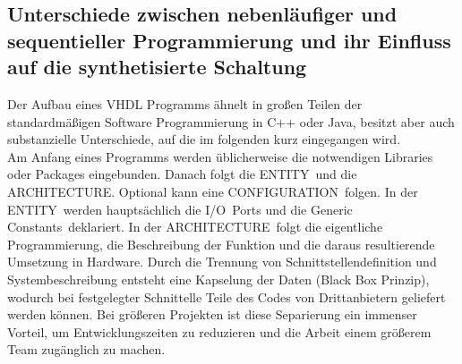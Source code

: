 \documentclass[12pt,a4paper]{scrartcl}	%
\begin{document}
\subsection{Unterschiede zwischen nebenläufiger und sequentieller Programmierung und ihr Einfluss auf die synthetisierte Schaltung}
Der Aufbau eines VHDL Programms ähnelt in großen Teilen der standardmäßigen Software Programmierung in C++ oder Java, besitzt aber auch substanzielle Unterschiede, auf die im folgenden kurz eingegangen wird.\\
Am Anfang eines Programms werden üblicherweise die notwendigen Libraries oder Packages eingebunden. 
Danach folgt die \glqq ENTITY\grqq~und die \glqq ARCHITECTURE\grqq. Optional kann eine \glqq CONFIGURATION\grqq~folgen.
In der \glqq ENTITY\grqq~werden hauptsächlich die \glqq I/O\grqq~Ports und die \glqq Generic Constants\grqq~deklariert.
In der \glqq ARCHITECTURE\grqq~folgt die eigentliche Programmierung, die Beschreibung der Funktion und die daraus resultierende Umsetzung in Hardware. Durch die Trennung von Schnittstellendefinition und Systembeschreibung entsteht eine Kapselung der Daten (Black Box Prinzip), wodurch bei festgelegter Schnittelle Teile des Codes von Drittanbietern geliefert werden können. Bei größeren Projekten ist diese Separierung ein immenser Vorteil, um  Entwicklungszeiten zu reduzieren und die Arbeit einem größerem Team zugänglich zu machen.
\end{document}
